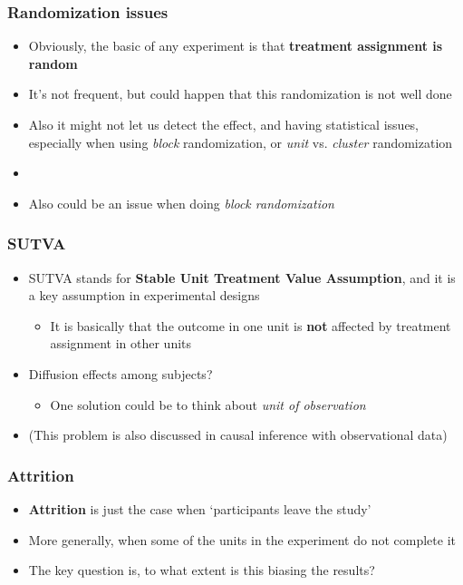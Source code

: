 \documentclass[aspectratio=43]{beamer}
\begin{document}
\begin{frame}
\frametitle{Randomization issues}
\centering

\begin{itemize}
  \item Obviously, the basic of any experiment is that \textbf{treatment assignment is random}
  \item It's not frequent, but could happen that this randomization is not well done
  \item Also it might not let us detect the effect, and having statistical issues, especially when using \textit{block} randomization, or \textit{unit} vs. \textit{cluster} randomization
  \item[]
  \item Also could be an issue when doing \textit{block randomization}
\end{itemize}

\end{frame}

\begin{frame}
\frametitle{SUTVA}
\centering

\begin{itemize}
  \item SUTVA stands for \textbf{Stable Unit Treatment Value Assumption}, and it is a key assumption in experimental designs
  \begin{itemize}
    \item It is basically that the outcome in one unit is \textbf{not} affected by treatment assignment in other units
  \end{itemize}
  \item Diffusion effects among subjects?
  \begin{itemize}
    \item One solution could be to think about \textit{unit of observation}
  \end{itemize}
  \item (This problem is also discussed in causal inference with observational data)
\end{itemize}

\end{frame}

\begin{frame}
\frametitle{Attrition}
\centering

\begin{itemize}
  \item \textbf{Attrition} is just the case when `participants leave the study'
  \item More generally, when some of the units in the experiment do not complete it
  \item The key question is, to what extent is this biasing the results?
\end{itemize}

\end{frame}
\end{document}
